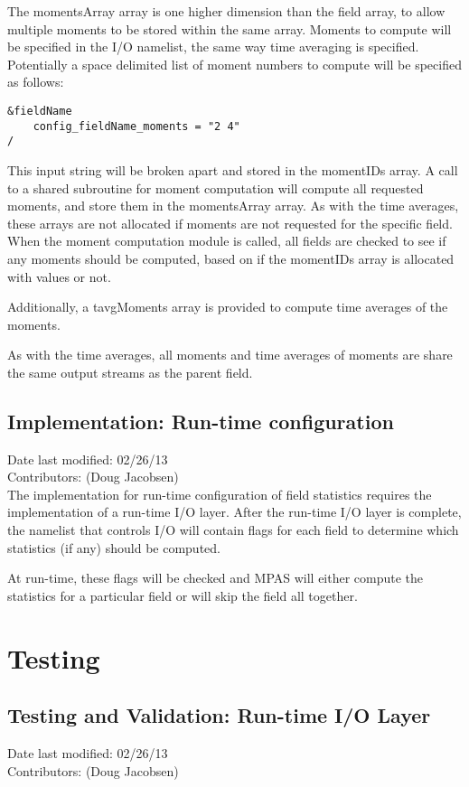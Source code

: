 \documentclass[11pt]{report}
\begin{document}
The momentsArray array is one higher dimension than the field array, to allow
multiple moments to be stored within the same array.  Moments to compute will
be specified in the I/O namelist, the same way time averaging is specified.
Potentially a space delimited list of moment numbers to compute will be
specified as follows:

\begin{lstlisting}
&fieldName
	config_fieldName_moments = "2 4"
/
\end{lstlisting}

This input string will be broken apart and stored in the momentIDs array. A
call to a shared subroutine for moment computation will compute all requested
moments, and store them in the momentsArray array. As with the time averages,
these arrays are not allocated if moments are not requested for the specific
field. When the moment computation module is called, all fields are checked to
see if any moments should be computed, based on if the momentIDs array is
allocated with values or not.

Additionally, a tavgMoments array is provided to compute time averages of the
moments.

As with the time averages, all moments and time averages of moments are share
the same output streams as the parent field.

\section{Implementation: Run-time configuration}
Date last modified: 02/26/13 \\
Contributors: (Doug Jacobsen) \\

The implementation for run-time configuration of field statistics requires the
implementation of a run-time I/O layer. After the run-time I/O layer is
complete, the namelist that controls I/O will contain flags for each field to
determine which statistics (if any) should be computed.

At run-time, these flags will be checked and MPAS will either compute the
statistics for a particular field or will skip the field all together.


\chapter{Testing}

\section{Testing and Validation: Run-time I/O Layer}
Date last modified: 02/26/13 \\
Contributors: (Doug Jacobsen) \\



\end{document}
